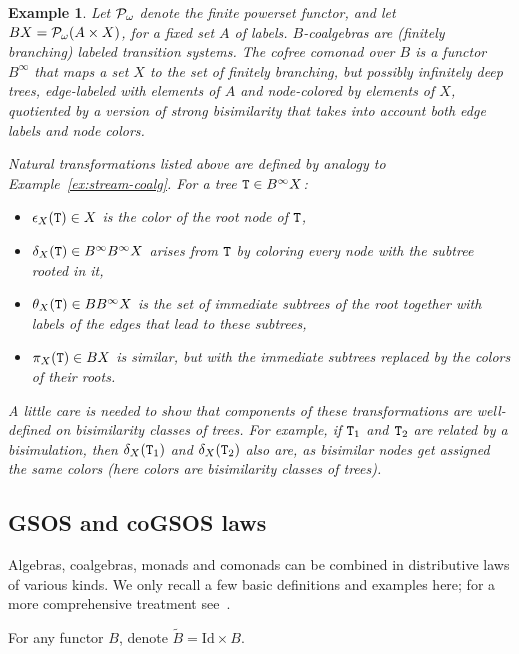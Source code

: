 \documentclass[adraft,copyright,creativecommons]{eptcs}
\newtheorem{example}[theorem]{Example}
\newcommand{\Bid}{\tilde{B}}
\newcommand{\Bb}{B^{\infty}}
\newcommand{\Id}{\textrm{Id}}
\newcommand{\Pf}{{\cal P}_{\omega}}
\begin{document}
\begin{example}\rm
Let $\Pf$ denote the finite powerset functor, and let $BX ={\cal P_\omega}(A\times X)$, for a fixed set $A$ of labels. $B$-coalgebras are {\em (finitely branching) labeled transition systems}.
The cofree comonad over $B$ is a functor $\Bb$ that maps a set $X$ to the set of finitely branching, but possibly infinitely deep trees, edge-labeled with elements of $A$ and node-colored by elements of $X$, quotiented by a version of strong bisimilarity that takes into account both edge labels and node colors.





Natural transformations listed above are defined by analogy to Example~\ref{ex:stream-coalg}. For a tree ${\tt T}\in\Bb X$:
\begin{itemize}
\item $\epsilon_X({\tt T})\in X$ is the color of the root node of ${\tt T}$,
\item $\delta_X({\tt T})\in \Bb\Bb X$ arises from ${\tt T}$ by coloring every node with the subtree rooted in it,
\item $\theta_X({\tt T})\in B\Bb X$ is the set of immediate subtrees of the root together with labels of the edges that lead to these subtrees,
\item $\pi_X({\tt T})\in BX$ is similar, but with the immediate subtrees replaced by the colors of their roots.
\end{itemize}
A little care is needed to show that components of these transformations are well-defined on bisimilarity classes of trees. For example, if ${\tt T}_1$ and ${\tt T}_2$ are related by a bisimulation, then $\delta_X({\tt T}_1)$ and $\delta_X({\tt T}_2)$ also are, as bisimilar nodes get assigned the same colors (here colors are bisimilarity classes of trees).



\end{example}

\subsection{GSOS and coGSOS laws}\label{sec:gsos}

Algebras, coalgebras, monads and comonads can be combined in distributive laws of various kinds. We only recall a few basic definitions and examples here; for a more comprehensive treatment see~\cite{tcs11}.

For any functor $B$, denote $\Bid=\Id\times B$.
\end{document}
